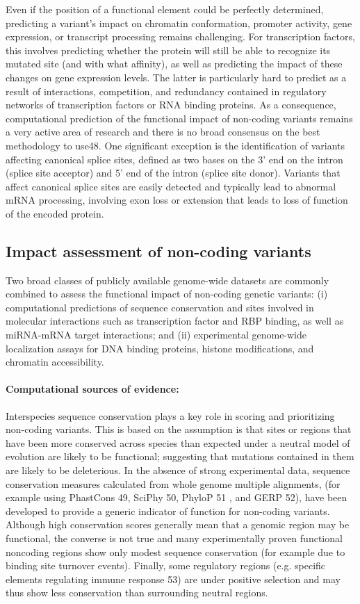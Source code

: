Even if the position of a functional element could be perfectly determined, predicting a variant’s impact on chromatin conformation, promoter activity, gene expression, or transcript processing remains challenging. For transcription factors, this involves predicting whether the protein will still be able to recognize its mutated site (and with what affinity), as well as predicting the impact of these changes on gene expression levels. The latter is particularly hard to predict as a result of interactions, competition, and redundancy contained in regulatory networks of transcription factors or RNA binding proteins. As a consequence, computational prediction of the functional impact of non-coding variants remains a very active area of research and there is no broad consensus on the best methodology to use48. One significant exception is the identification of variants affecting canonical splice sites, defined as two bases on the 3’ end on the intron (splice site acceptor) and 5’ end of the intron (splice site donor). Variants that affect canonical splice sites are easily detected and typically lead to abnormal mRNA processing, involving exon loss or extension that leads to loss of function of the encoded protein.

\subsection{Impact assessment of non-coding variants}

Two broad classes of publicly available genome-wide datasets are commonly combined to assess the functional impact of non-coding genetic variants: (i) computational predictions of sequence conservation and sites involved in molecular interactions such as transcription factor and RBP binding, as well as miRNA-mRNA target interactions; and (ii) experimental genome-wide localization assays for DNA binding proteins, histone modifications, and chromatin accessibility.

\paragraph{Computational sources of evidence:} Interspecies sequence conservation plays a key role in scoring and prioritizing non-coding variants. This is based on the assumption is that sites or regions that have been more conserved across species than expected under a neutral model of evolution are likely to be functional; suggesting that mutations contained in them are likely to be deleterious. In the absence of strong experimental data, sequence conservation measures calculated from whole genome multiple alignments, (for example using PhastCons 49, SciPhy 50, PhyloP 51 , and GERP 52), have been developed to provide a generic indicator of function for non-coding variants. Although high conservation scores generally mean that a genomic region may be functional, the converse is not true and many experimentally proven functional noncoding regions show only modest sequence conservation (for example due to binding site turnover events). Finally, some regulatory regions (e.g. specific elements regulating immune response 53) are under positive selection and may thus show less conservation than surrounding neutral regions. 

